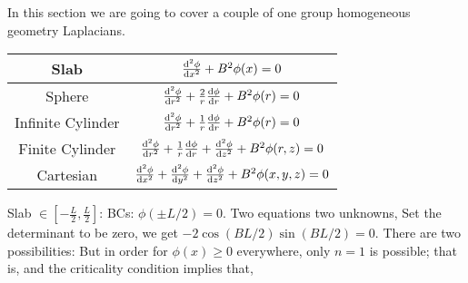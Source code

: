\documentclass{school-22.211-notes}
\begin{document}
\clearpage
{}
In this section we are going to cover a couple of one group homogeneous geometry Laplacians. 
\begin{table}
  \centering
  \begin{tabular}{|c|c|} \hline
    Slab & $\frac{\mathrm{d}^{2}\phi}{\mathrm{d}x^{2}} + B^2 \phi(x) = 0$ \\ \hline
    Sphere & $\frac{\mathrm{d}^{2}\phi}{\mathrm{d}r^{2}} + \frac{2}{r} \frac{\mathrm{d}\phi}{\mathrm{d}r} + B^2 \phi(r) = 0$ \\ \hline
    Infinite Cylinder & $\frac{\mathrm{d}^{2}\phi}{\mathrm{d}r^{2}} + \frac{1}{r} \frac{\mathrm{d}\phi}{\mathrm{d}r} + B^2 \phi(r) = 0$ \\ \hline
    Finite Cylinder & $\frac{\mathrm{d}^{2}\phi}{\mathrm{d}r^{2}} + \frac{1}{r} \frac{\mathrm{d}\phi}{\mathrm{d}r} + \frac{\mathrm{d}^{2}\phi}{\mathrm{d}z^{2}} + B^2 \phi(r,z) = 0$ \\ \hline
    Cartesian & $\frac{\mathrm{d}^{2}\phi}{\mathrm{d}x^{2}} + \frac{\mathrm{d}^{2}\phi}{\mathrm{d}y^{2}} + \frac{\mathrm{d}^{2}\phi}{\mathrm{d}z^{2}} + B^2 \phi(x,y,z) = 0$ \\ \hline
  \end{tabular}
\end{table}




\clearpage
{}
 Slab $\in  \left[- \frac{L}{2}, \frac{L}{2} \right]$:
BCs: $\phi(\pm L/2) = 0$. Two equations two unknowns, 
  Set the determinant to be zero, we get $-2 \cos (BL/2) \sin (BL/2) = 0$. There are two possibilities: 
But in order for $\phi(x) \ge 0$ everywhere, only $n=1$ is possible; that is, 
and the criticality condition implies that, 
\end{document}
